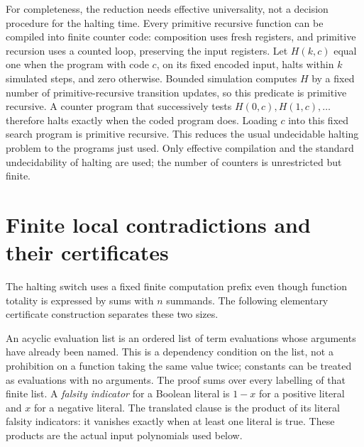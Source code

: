 \documentclass[11pt,a4paper,oneside,openany]{book}
\theoremstyle{definition}\newtheorem{definition}[theorem]{Definition}
\theoremstyle{remark}\newtheorem{remark}[theorem]{Remark}
\numberwithin{equation}{chapter}
\begin{document}
For completeness, the reduction needs effective universality, not a
decision procedure for the halting time. Every primitive recursive function
can be compiled into finite counter code: composition uses fresh registers,
and primitive recursion uses a counted loop, preserving the input registers.
Let $H(k,c)$ equal one when the program with code $c$, on its fixed
encoded input, halts within $k$ simulated steps, and zero otherwise.
Bounded simulation computes $H$ by a fixed number of primitive-recursive
transition updates, so this predicate is primitive recursive. A counter program that successively tests
$H(0,c),H(1,c),\ldots$ therefore halts exactly when the coded program does.
Loading $c$ into this fixed search program is primitive recursive. This
reduces the usual undecidable halting problem to the programs just used.
Only effective compilation and the standard undecidability of halting are used; the number of counters is unrestricted but finite.

\section{Finite local contradictions and their certificates}
\label{tx:app:finite-certificate}
The halting switch uses a fixed finite computation prefix even though
function totality is expressed by sums with $n$ summands. The following
elementary certificate construction separates these two sizes.

An acyclic evaluation list is an ordered list of term evaluations
whose arguments have already been named. This is a dependency condition
on the list, not a prohibition on a function taking the same value twice;
constants can be treated as evaluations with no arguments. The proof
sums over every labelling of that finite list. A \emph{falsity indicator}
for a Boolean literal is $1-x$ for a positive literal and $x$ for a
negative literal. The translated clause is the product of its literal
falsity indicators: it vanishes exactly when at least one literal is
true. These products are the actual input polynomials used below.
\end{document}
